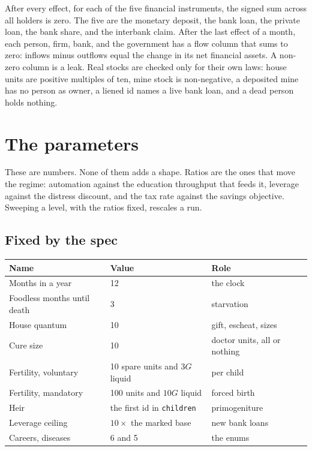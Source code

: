 \documentclass[11pt]{article}
\begin{document}
After every effect, for each of the five financial instruments, the signed
sum across all holders is zero. The five are the monetary deposit, the bank
loan, the private loan, the bank share, and the interbank claim. After the last effect of a month, each
person, firm, bank, and the government has a flow column that sums to zero:
inflows minus outflows equal the change in its net financial assets.
A non-zero column is a leak. Real stocks are checked only for their own
laws: house units are positive multiples of ten, mine stock is non-negative,
a deposited mine has no person as owner, a liened id names a live bank loan,
and a dead person holds nothing.

\section{The parameters}
\label{sec:parameters}

These are numbers. None of them adds a shape. Ratios are the ones that move
the regime: automation against the education throughput that feeds it,
leverage against the distress discount, and the tax rate against the
savings objective. Sweeping a level, with the ratios fixed, rescales a run.

\subsection{Fixed by the spec}

\begin{center}
\small
\begin{tabular}{@{}llp{6.4cm}@{}}
\toprule
Name & Value & Role \\
\midrule
Months in a year & 12 & the clock \\
Foodless months until death & 3 & starvation \\
House quantum & 10 & gift, escheat, sizes \\
Cure size & 10 & doctor units, all or nothing \\
Fertility, voluntary & 10 spare units and $3G$ liquid & per child \\
Fertility, mandatory & 100 units and $10G$ liquid & forced birth \\
Heir & the first id in \texttt{children} & primogeniture \\
Leverage ceiling & $10\times$ the marked base & new bank loans \\
Careers, diseases & 6 and 5 & the enums \\
\bottomrule
\end{tabular}
\end{center}
\end{document}
